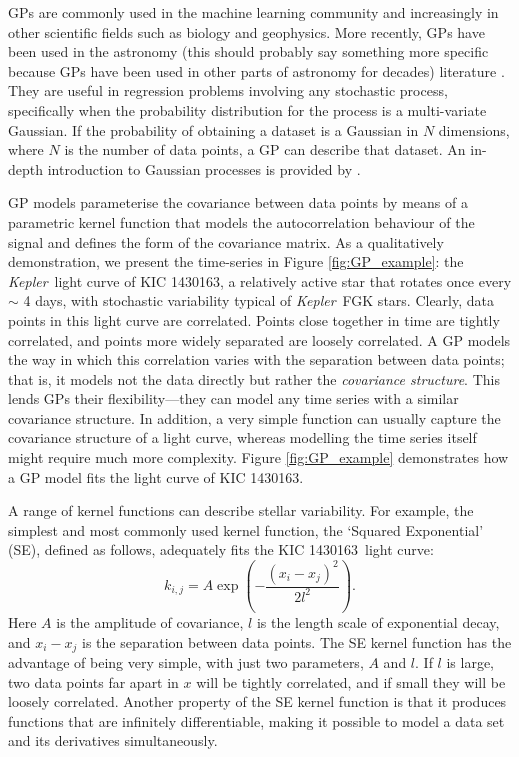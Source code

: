 \documentclass[useAMS, usenatbib, preprint, 12pt]{aastex}
\newcommand{\kepexample}{1430163}
\newcommand{\Kepler}{{\it Kepler}}
\newcommand{\kepler}{\Kepler}
\newcommand{\eg}{{\it e.g.}}
\newcommand{\dfmcomment}[1]{{\color{red}#1}}
\begin{document}
GPs are commonly used in the machine learning community and increasingly
in other scientific fields such as biology and geophysics.
More recently, GPs have been used in the astronomy \dfmcomment{(this should
probably say something more specific because GPs have been used in other parts
of astronomy for decades)} literature \citep[see
\eg][]{Gibson2012, Haywood2014, Dawson2014, Barclay2015, Haywood2015,
Evans2015, Rajpaul2015, Rajpaul2016, Aigrain2016}.
They are useful in regression problems involving any stochastic process,
specifically when the probability distribution for the process is a
multi-variate Gaussian.
If the probability of obtaining a dataset is a Gaussian in $N$ dimensions,
where $N$ is the number of data points, a GP can describe that dataset.
An in-depth introduction to Gaussian processes is provided by
\citet{Rasmussen2005}.

GP models parameterise the covariance between data points by means of a
parametric kernel function that models the autocorrelation behaviour of the
signal and defines the form of the covariance matrix.
As a qualitatively demonstration, we present the time-series
in Figure \ref{fig:GP_example}:
the \kepler\ light curve of KIC \kepexample, a relatively active star that
rotates once every $\sim$ 4 days, with stochastic variability typical of
\kepler\ FGK stars.
Clearly, data points in this light curve are correlated.
Points close together in time are tightly correlated, and points more
widely separated are loosely correlated.
A GP models the way in which this correlation varies with the separation between
data points; that is, it models not the data directly but rather the {\it
covariance structure}.
This lends GPs their flexibility---they can model any time
series with a similar covariance structure.
In addition, a very simple function can usually capture the covariance
structure of a light curve, whereas modelling the time series itself
might require much more complexity.
Figure \ref{fig:GP_example} demonstrates how a GP model fits the light curve of
KIC \kepexample.

A range of kernel functions can describe stellar variability.
For example, the simplest and most commonly used kernel function, the `Squared
Exponential' (SE), defined as follows, adequately fits the
KIC \kepexample\ light curve:
\begin{equation}
k_{i,j} = A \exp \left(-\frac{(x_i - x_j)^2}{2l^2} \right).
\end{equation}
\label{eq:SE}
Here $A$ is the amplitude of covariance, $l$ is the length scale of
exponential decay, and $x_i-x_j$ is the separation between data points.
The SE kernel function has the advantage of being very simple, with
just two parameters, $A$ and $l$.
If $l$ is large, two data points far apart in $x$ will be tightly correlated,
and if small they will be loosely correlated.
Another property of the SE kernel function is that it produces functions that
are infinitely differentiable, making it possible to model a data set
and its derivatives simultaneously.
\end{document}
